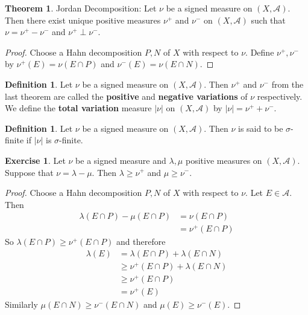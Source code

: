 \documentclass[12pt]{amsart}
\theoremstyle{definition}
\newtheorem{defn}[definition]{Definition}
\newtheorem{thm}[definition]{Theorem}
\newtheorem{ex}[definition]{Exercise}
\newcommand{\lam}{\lambda}
\newcommand{\sig}{\sigma}
\newcommand{\MA}{\mathcal{A}}
\begin{document}
	\begin{thm}{Jordan Decomposition:}
		Let $\nu$ be a signed measure on $(X, \MA)$. Then there exist unique positive measures $\nu^+$ and $\nu^-$ on $(X, \MA)$ such that $\nu = \nu^+ - \nu^-$ and $\nu^+ \perp \nu^-$. 
	\end{thm}
	
	\begin{proof}
		Choose a Hahn decomposition $P,N$ of $X$ with respect to $\nu$. Define $\nu^+, \nu^-$ by $\nu^+(E)= \nu(E \cap P)$ and $\nu^-(E) = \nu(E \cap N)$.
	\end{proof}
	
	\begin{defn}
		Let $\nu$ be a signed measure on $(X, \MA)$. Then $\nu^+$ and $\nu^-$ from the last theorem are called the \textbf{positive} and \textbf{negative variations} of $\nu$ respectively. We define the \textbf{total variation} measure $|\nu|$ on $(X, \MA)$ by $|\nu| = \nu^+ + \nu^-$. 
	\end{defn}
	
	\begin{defn}
		Let $\nu$ be a signed measure on $(X,\MA)$. Then $\nu$ is said to be $\sig$-finite if $|\nu|$ is $\sig$-finite.
	\end{defn}
	
	\begin{ex}
		Let $\nu$ be a signed measure and $\lam, \mu$ positive measures on $(X,\MA)$. Suppose that $\nu = \lam - \mu$. Then $\lam \geq \nu^+$ and $\mu \geq \nu^-$.
	\end{ex}
	
	\begin{proof}
		Choose a Hahn decomposition $P,N$ of $X$ with respect to $\nu$. Let $E \in \MA$. Then 
		\begin{align*}
			\lam(E \cap P) - \mu(E \cap P) 
			&= \nu(E \cap P)\\
			&= \nu^+(E \cap P)
		\end{align*}
		So $\lam(E \cap P) \geq  \nu^+(E \cap P) $ and therefore 
		\begin{align*}
			\lam(E) 
			&= \lam(E \cap P) + \lam(E \cap N)\\
			& \geq \nu^+(E \cap P) + \lam (E \cap N)\\
			& \geq \nu^+(E \cap P)\\
			& = \nu^+(E)
		\end{align*} 
		Similarly $\mu(E \cap N) \geq \nu^-(E \cap N)$ and $\mu(E) \geq \nu^-(E)$.
	\end{proof}
	
\end{document}
